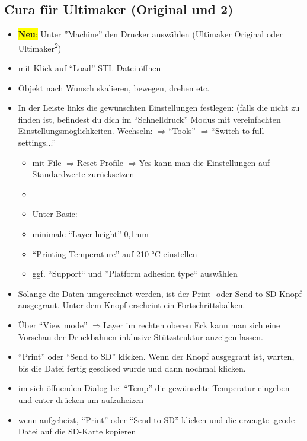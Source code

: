 \documentclass{\basedir/fablab-document}
\newcommand{\ts}[1]{\textsuperscript{#1}}
\newcommand{\ra}{$\Rightarrow$}
\begin{document}
\subsection{Cura für Ultimaker (Original und 2)}
\begin{itemize}
    \item \colorbox{yellow}{\textbf{Neu}:} Unter ''Machine'' den Drucker auswählen (Ultimaker Original oder Ultimaker\ts2)
\item mit Klick auf ``Load'' STL-Datei öffnen
\item Objekt nach Wunsch skalieren, bewegen, drehen etc.
\item In der Leiste links die gewünschten Einstellungen festlegen: (falls die nicht zu finden ist, befindest du dich im ``Schnelldruck'' Modus mit vereinfachten Einstellungsmöglichkeiten. Wechseln: \ra ``Tools'' \ra ``Switch to full settings...''
 \begin{itemize}
  \item mit File \ra Reset Profile \ra Yes kann man die Einstellungen auf Standardwerte zurücksetzen
  \item {}
  \item Unter Basic:
  \item minimale ``Layer height'' 0,1mm
  \item ``Printing Temperature'' auf 210 °C einstellen
  \item ggf. ``Support`` und ''Platform adhesion type`` auswählen
 \end{itemize}
\item Solange die Daten umgerechnet werden, ist der Print- oder Send-to-SD-Knopf ausgegraut. Unter dem Knopf erscheint ein Fortschrittsbalken.
\item Über \enquote{View mode} \ra Layer im rechten oberen Eck kann man sich eine Vorschau der Druckbahnen inklusive Stützstruktur anzeigen lassen.
\item ``Print'' oder ``Send to SD'' klicken. Wenn der Knopf ausgegraut ist, warten, bis die Datei fertig gescliced wurde und dann nochmal klicken.
\item im sich öffnenden Dialog bei ``Temp'' die gewünschte Temperatur eingeben und enter drücken um aufzuheizen
\item wenn aufgeheizt, ``Print'' oder ``Send to SD'' klicken und die erzeugte .gcode-Datei auf die SD-Karte kopieren
\end{itemize}
\end{document}
